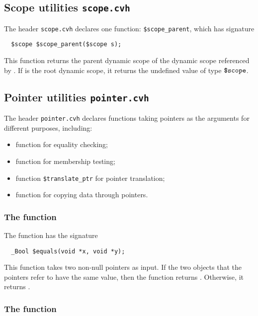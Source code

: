 \subsection{Scope utilities \texttt{scope.cvh}}
\label{subsec:scopeLibrary}

The header \texttt{scope.cvh} declares one function: \texttt{\$scope\_parent}, which has signature

\begin{verbatim}
  $scope $scope_parent($scope s);
\end{verbatim}
This function returns the parent dynamic scope of the dynamic scope referenced by
.  If  is the root dynamic scope, it returns the undefined
value of type $\mbox{\texttt{\${}scope}}$.

\subsection{Pointer utilities \texttt{pointer.cvh}}
\label{subsec:pointerLibrary}
The header \texttt{pointer.cvh} declares functions taking pointers as the arguments for different purposes, including:
\begin{itemize}
\item function \cequals{} for equality checking;
\item function \ccontains{} for membership testing;
\item function \texttt{\$translate\_ptr} for pointer translation;
\item function \ccopy{} for copying data through pointers.
\end{itemize}

\subsubsection{The \cequals{} function}

The \cequals{} function has the signature
\begin{verbatim}
  _Bool $equals(void *x, void *y);
\end{verbatim}

This function takes two non-null pointers as input. If  the two objects that the pointers refer to have the same value, then the
function returns \ctrue. Otherwise, it returns \cfalse.

\subsubsection{The \ccontains{} function}

